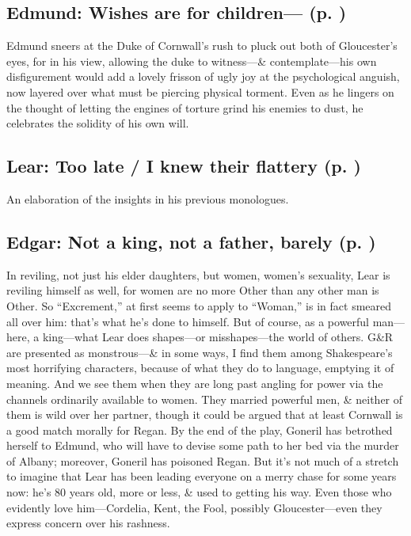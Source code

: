 \subsection{Edmund: Wishes are for children--- (p. \pageref{ch:lear_ay})}
Edmund sneers at the Duke of Cornwall's rush to pluck out both of Gloucester's eyes, for in his view, allowing the duke to witness---\& contemplate---his own disfigurement would add a lovely frisson of ugly joy at the psychological anguish, now layered over what must be piercing physical torment. Even as he lingers on the thought of letting the engines of torture grind his enemies to dust, he celebrates the solidity of his own will.

\subsection{Lear: Too late / I knew their flattery (p. \pageref{ch:lear_az})}
An elaboration of the insights in his previous monologues.

\subsection{Edgar: Not a king, not a father, barely (p. \pageref{ch:lear_ba})}
In reviling, not just his elder daughters, but women, women's sexuality, Lear is reviling himself as well, for women are no more Other than any other man is Other. So ``Excrement,'' at first seems to apply to ``Woman,'' is in fact smeared all over him: that's what he's done to himself. But of course, as a powerful man---here, a king---what Lear does shapes---or misshapes---the world of others. G\&R are presented as monstrous---\& in some ways, I find them among Shakespeare's most horrifying characters, because of what they do to language, emptying it of meaning. And we see them when they are long past angling for power via the channels ordinarily available to women. They married powerful men, \& neither of them is wild over her partner, though it could be argued that at least Cornwall is a good match morally for Regan. By the end of the play, Goneril has betrothed herself to Edmund, who will have to devise some path to her bed via the murder of Albany; moreover, Goneril has poisoned Regan. But it's not much of a stretch to imagine that Lear has been leading everyone on a merry chase for some years now: he's 80 years old, more or less, \& used to getting his way. Even those who evidently love him---Cordelia, Kent, the Fool, possibly Gloucester---even they express concern over his rashness.

